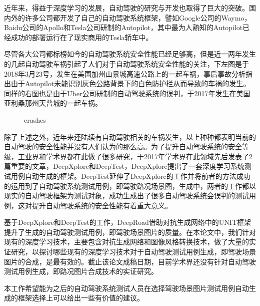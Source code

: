 \begin{cabstract}

近年来，得益于深度学习的发展，自动驾驶的研究与开发也取得了巨大的突破。国内外的许多公司都开发了自己的自动驾驶系统框架，譬如Google公司的Waymo，Baidu公司的Apollo和Tesla公司研制的Autopilot，其中最为人熟知的Autopilot已经成功的部署运行在了现实商用的Tesla轿车中。

尽管各大公司都标榜如今的自动驾驶系统安全性能已经足够高，但是近一两年发生的几起自动驾驶车祸引起了人们对于自动驾驶系统安全性能的关注，下左图是于2018年3月23号，发生在美国加州山景城高速公路上的一起车祸，事后事故分析指出由于Autopilot未能识别灰色公路背景下的白色防护栏从而导致的车祸的发生。同样的右图也是由于Uber公司研制的自动驾驶系统的误判，于2017年发生在美国亚利桑那州天普城的一起车祸。

\begin{figure}[h]
  \centering
  \caption{crashes}
\end{figure}

除了上述之外，近年来还陆续有自动驾驶相关的车祸发生，以上种种都表明当前的自动驾驶的安全性能并没有人们认为的那么高。为了提升自动驾驶系统的安全等级，工业界和学术界都在此做了很多研究，于2017年学术界在此领域先后发表了2篇重要的文章，DeepXplore\cite{DeepXplore}和DeepTest\cite{DeepTest}，DeepXplore提出了一套深度学习系统测试用例自动生成的框架。DeepTest延伸了DeepXplore的工作并将前者的方法成功的运用到了自动驾驶系统测试用例，即驾驶路况场景图，生成中，两者的工作都以现实的自动驾驶框架为测试对象，成功生成出了很多自动驾驶系统会误判的测试用例，这对提升自动驾驶系统的安全性能有着重大意义。 

基于DeepXplore和DeepTest的工作，DeepRoad\cite{DeepRoad}借助对抗生成网络\cite{GAN}中的UNIT\cite{UNIT}框架提升了生成的自动驾驶测试用例，即驾驶场景图片的质量。在本论文中，我们针对现有的深度学习技术，主要包含对抗生成网络和图像风格转换技术，做了大量的实证研究，以探讨哪些现有的深度学习技术对于自动驾驶测试用例生成，即驾驶场景图片的合成，是最有效的。截止该论文成稿日期，目前学术界还没有针对自动驾驶测试用例生成，即路况图片合成技术的实证研究。 

本工作希望能为之后的自动驾驶系统测试人员在选择驾驶场景图片测试用例自动生成的框架选择上可以给出一些有价值的建议。

\end{cabstract}

